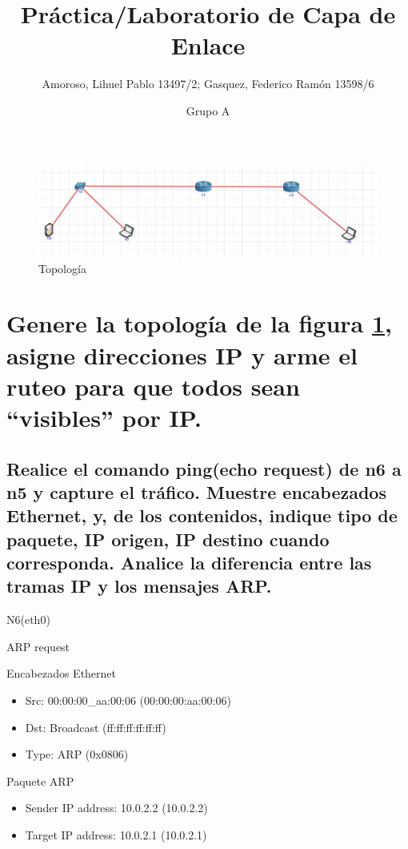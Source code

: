 \documentclass[a4paper,11pt]{article} %
\title{Práctica/Laboratorio de Capa de Enlace}
\author{Amoroso, Lihuel Pablo 13497/2; Gasquez, Federico Ramón 13598/6}
\date{Grupo A} %
\begin{document}
\maketitle

\begin{figure}[htbp]
    \centering
    \includegraphics[]{imgs/topologia.jpg}
    \caption{Topología}
    \label{fig:topologia}
\end{figure}

\section{Genere la topología de la figura \ref{fig:topologia}, asigne direcciones IP y arme el ruteo para que todos sean “visibles” por IP.}

\subsection{Realice el comando ping(echo request) de n6 a n5 y capture el tráfico. Muestre encabezados Ethernet, y, de los contenidos, indique tipo de paquete, IP origen, IP destino cuando corresponda. Analice la diferencia entre las tramas IP y los mensajes ARP.}

\setlength{\leftskip}{0.5cm}N6(eth0)

\setlength{\leftskip}{1cm}ARP request

\indent\indent Encabezados Ethernet
\begin{itemize}
    \setlength{\itemindent}{80px}
    \item Src: 00:00:00\_aa:00:06 (00:00:00:aa:00:06)
    \item Dst: Broadcast (ff:ff:ff:ff:ff:ff)
    \item Type: ARP (0x0806)
\end{itemize}

\indent\indent Paquete ARP
\begin{itemize}
    \setlength{\itemindent}{80px}
    \item Sender IP address: 10.0.2.2 (10.0.2.2)
    \item Target IP address: 10.0.2.1 (10.0.2.1)
\end{itemize}
\end{document}

